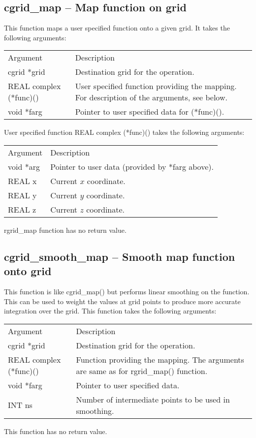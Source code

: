 \documentclass[12pt,letterpaper]{report}
\begin{document}
\subsection{cgrid\_map -- Map function on grid}

This function maps a user specified function onto a given grid. It takes the following arguments:
\begin{longtable}{p{} p{}}
Argument & Description\\
\cline{1-2}
cgrid *grid & Destination grid for the operation.\\
REAL complex (*func)() & User specified function providing the mapping. For description of the arguments, see below.\\
void *farg & Pointer to user specified data for (*func)().\\
\end{longtable}
User specified function REAL complex (*func)() takes the following arguments:
\begin{longtable}{p{} p{}}
Argument & Description\\
\cline{1-2}
void *arg & Pointer to user data (provided by *farg above).\\
REAL x & Current $x$ coordinate.\\
REAL y & Current $y$ coordinate.\\
REAL z & Current $z$ coordinate.\\
\end{longtable}
\noindent
rgrid\_map function has no return value.

\subsection{cgrid\_smooth\_map -- Smooth map function onto grid}

This function is like cgrid\_map() but performs linear smoothing on the function. This can be used to weight the values at grid points to produce more accurate integration over the grid. This function takes the following arguments:
\begin{longtable}{p{} p{}}
Argument & Description\\
\cline{1-2}
cgrid *grid & Destination grid for the operation.\\
REAL complex (*func)() & Function providing the mapping. The arguments are same as for rgrid\_map() function.\\
void *farg & Pointer to user specified data.\\
INT ns & Number of intermediate points to be used in smoothing.\\
\end{longtable}
\noindent
This function has no return value.
\end{document}
